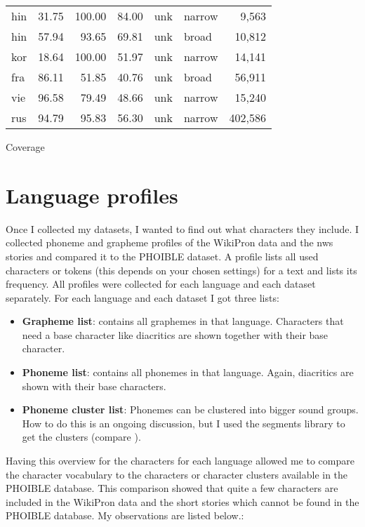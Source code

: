 {\begin{tabularx}{\textwidth}{|lrrrXXr|}
hin &     31.75 &  100.00 &   84.00 &      unk &    narrow &         9,563 \\
hin &     57.94 &   93.65 &   69.81 &      unk &     broad &        10,812 \\
kor &     18.64 &  100.00 &   51.97 &      unk &    narrow &        14,141 \\
fra &     86.11 &   51.85 &   40.76 &      unk &     broad &        56,911 \\
vie &     96.58 &   79.49 &   48.66 &      unk &    narrow &        15,240 \\
rus &     94.79 &   95.83 &   56.30 &      unk &    narrow &       402,586 \\
\hline
\end{tabularx}}{Coverage}

\section{Language profiles}
\label{sec:lang-profiles}
Once I collected my datasets, I wanted to find out what characters they include. I collected phoneme and grapheme profiles of the WikiPron data and the \ac{nws} stories and compared it to the PHOIBLE dataset. A profile lists all used characters or tokens (this depends on your chosen settings) for a text and lists its frequency. All profiles were collected for each language and each dataset separately. For each language and each dataset I got three lists:
\begin{itemize}
 \item \textbf{Grapheme list}: contains all graphemes in that language. Characters that need a base character like diacritics are shown together with their base character. 
 \item \textbf{Phoneme list}: contains all phonemes in that language. Again, diacritics are shown with their base characters.
 \item \textbf{Phoneme cluster list}: Phonemes can be clustered into bigger sound groups. How to do this is an ongoing discussion, but I used the segments library to get the clusters (compare \citet{unicode-lingu}).
\end{itemize}

Having this overview for the characters for each language allowed me to compare the character vocabulary to the characters or character clusters available in the PHOIBLE database. This comparison showed that quite a few characters are included in the WikiPron data and the short stories which cannot be found in the PHOIBLE database. My observations are listed below.:

